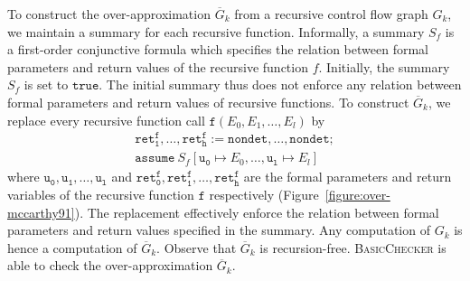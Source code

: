 To construct the over-approximation $\overline{G}_k$ from a
recursive control flow graph $G_k$, we maintain a summary for each
recursive function. Informally, a summary $S_f$ is a first-order
conjunctive formula which specifies the relation between formal
parameters and return values of the recursive function
$f$. Initially, the summary $S_f$ is set to $\mathtt{true}$. The
initial summary thus does not enforce any relation between formal
parameters and return values of recursive functions. To construct
$\overline{G}_k$, we replace every recursive function call $\mathtt{f}
(E_0, E_1, \ldots, E_l)$ by
\begin{equation*}
  \begin{array}{l}
    \mathtt{ret^{f}_1}, \ldots, \mathtt{ret^{f}_h} :=
    \mathtt{nondet}, \ldots, \mathtt{nondet};\\
    \mathtt{assume}\ S_f[\mathtt{u_0} \mapsto E_0, \ldots, 
    \mathtt{u_l} \mapsto E_l]
  \end{array}
\end{equation*}
where $\mathtt{u_0}, \mathtt{u_1}, \ldots, \mathtt{u_l}$ and
$\mathtt{ret^f_0}, \mathtt{ret^f_1}, \ldots, \mathtt{ret^f_h}$ are the
formal parameters and return variables of the recursive function
$\mathtt{f}$ respectively (Figure~\ref{figure:over-mccarthy91}).
The replacement effectively enforce the relation between formal
parameters and return values specified in the summary. Any computation
of $G_k$ is hence a computation of $\overline{G}_k$. Observe that
$\overline{G}_k$ is recursion-free. \textsc{BasicChecker} is able to
check the over-approximation $\overline{G}_k$.

